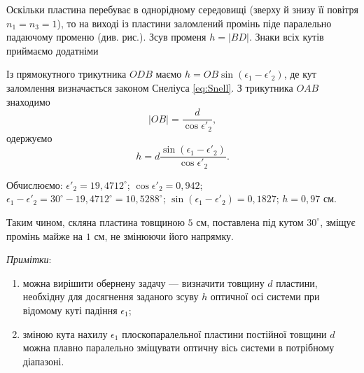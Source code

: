 \begin{solutionexample}

	Оскільки пластина перебуває в однорідному середовищі (зверху й
	знизу її повітря $n_1 = n_3 = 1$), то на виході із пластини заломлений промінь піде паралельно падаючому променю (див. рис.). Зсув променя $h = |BD|$. Знаки всіх кутів приймаємо додатніми

	\begin{center}
		
	\end{center}

	Із прямокутного трикутника $ODB$ маємо $h = OB \sin(\epsilon_1 - \epsilon'_2)$, де кут заломлення визначається законом Снеліуса \eqref{eq:Snell}.
	З трикутника $OAB$ знаходимо
	\[
		|OB| = \frac{d}{\cos\epsilon'_2},
	\]
	одержуємо
	\[
		h = d \frac{\sin(\epsilon_1 - \epsilon'_2)}{\cos\epsilon'_2}.
	\]

	Обчислюємо: $\epsilon'_2 = 19,4712^\circ$; $\cos\epsilon'_2 = 0,942$; $\epsilon_1 - \epsilon'_2 = 30^\circ - 19,4712^\circ = 10,5288^\circ$; $\sin(\epsilon_1 - \epsilon'_2) = 0,1827$; $h = 0,97$ см.

	Таким чином, скляна пластина товщиною $5$ см, поставлена під кутом
	$30^\circ$, зміщує промінь майже на $1$ см, не змінюючи його напрямку.

	\emph{Примітки}:
	\begin{enumerate}\small
		\item можна вирішити обернену задачу --- визначити товщину $d$ пластини, необхідну
		      для досягнення заданого зсуву $h$ оптичної осі системи при відомому куті падіння $\epsilon_1$;
		\item зміною кута нахилу $\epsilon_1$ плоскопаралельної пластини постійної товщини $d$
		      можна плавно паралельно зміщувати оптичну вісь системи в потрібному діапазоні.
	\end{enumerate}

\end{solutionexample}


